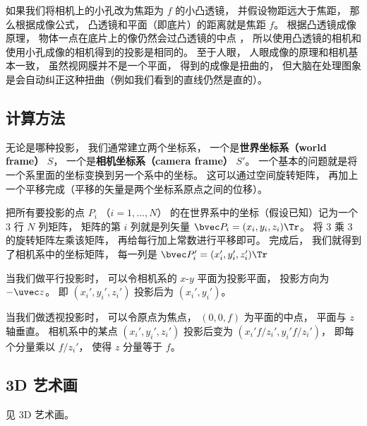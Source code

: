 如果我们将相机上的小孔改为焦距为 $f$ 的小凸透镜， 并假设物距远大于焦距， 那么根据成像公式， 凸透镜和平面（即底片）的距离就是焦距 $f$。 根据凸透镜成像原理， 物体一点在底片上的像仍然会过凸透镜的中点%
， 所以使用凸透镜的相机和使用小孔成像的相机得到的投影是相同的。 至于人眼， 人眼成像的原理和相机基本一致， 虽然视网膜并不是一个平面， 得到的成像是扭曲的， 但大脑在处理图象是会自动纠正这种扭曲（例如我们看到的直线仍然是直的）。

\subsection{计算方法}
无论是哪种投影， 我们通常建立两个坐标系， 一个是\textbf{世界坐标系（world frame）} $S$， 一个是\textbf{相机坐标系}\textbf{（camera frame）} $S'$。 一个基本的问题就是将一个系里面的坐标变换到另一个系中的坐标。 这可以通过空间旋转矩阵， 再加上一个平移完成（平移的矢量是两个坐标系原点之间的位移）。

把所有要投影的点 $P_i$ （$i = 1, \dots, N$） 的在世界系中的坐标（假设已知）记为一个 3 行 $N$ 列矩阵， 矩阵的第 $i$ 列就是列矢量 $\bvec P_i = (x_i, y_i, z_i)\Tr$。 将 3 乘 3 的旋转矩阵左乘该矩阵， 再给每行加上常数进行平移即可。 完成后， 我们就得到了相机系中的坐标矩阵， 每一列是 $\bvec P_i' = (x_i', y_i', z_i')\Tr$

当我们做平行投影时， 可以令相机系的 $x$-$y$ 平面为投影平面， 投影方向为 $-\uvec z$。 即 $(x_i', y_i', z_i')$ 投影后为 $(x_i', y_i')$。

当我们做透视投影时， 可以令原点为焦点， $(0, 0, f)$ 为平面的中点， 平面与 $z$ 轴垂直。 相机系中的某点 $(x_i', y_i', z_i')$ 投影后变为 $(x_i' f/z_i', y_i' f/z_i')$， 即每个分量乘以 $f/z_i'$， 使得 $z$ 分量等于 $f$。


\subsection{3D 艺术画}
见 3D 艺术画。
